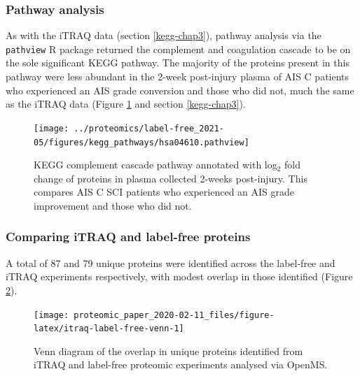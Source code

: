 \documentclass[
]{article}
\begin{document}
\hypertarget{pathway-analysis}{%
\subsubsection{Pathway analysis}\label{pathway-analysis}}

As with the iTRAQ data (section \ref{kegg-chap3}), pathway analysis via the \texttt{pathview} R package returned the complement and coagulation cascade to be on the sole significant KEGG pathway.
The majority of the proteins present in this pathway were less abundant in the 2-week post-injury plasma of AIS C patients who experienced an AIS grade conversion and those who did not, much the same as the iTRAQ data (Figure \ref{fig:kegg-complement-chap4} and section \ref{kegg-chap3}).



\begin{figure}

{\centering \texttt{[image: ../proteomics/label-free\_2021-05/figures/kegg\_pathways/hsa04610.pathview]} 

}

\caption{KEGG complement cascade pathway annotated with log\(_2\) fold change of proteins in plasma collected 2-weeks post-injury. This compares AIS C SCI patients who experienced an AIS grade improvement and those who did not.}\label{fig:kegg-complement-chap4}
\end{figure}

\hypertarget{comparing-itraq-and-label-free-proteins}{%
\subsubsection{Comparing iTRAQ and label-free proteins}\label{comparing-itraq-and-label-free-proteins}}

A total of 87 and 79 unique proteins were identified across the label-free and iTRAQ experiments respectively, with modest overlap in those identified (Figure \ref{fig:itraq-label-free-venn}).



\begin{figure}

{\centering \texttt{[image: proteomic\_paper\_2020-02-11\_files/figure-latex/itraq-label-free-venn-1]} 

}

\caption{Venn diagram of the overlap in unique proteins identified from iTRAQ and label-free proteomic experiments analysed via OpenMS.}\label{fig:itraq-label-free-venn}
\end{figure}
\end{document}
